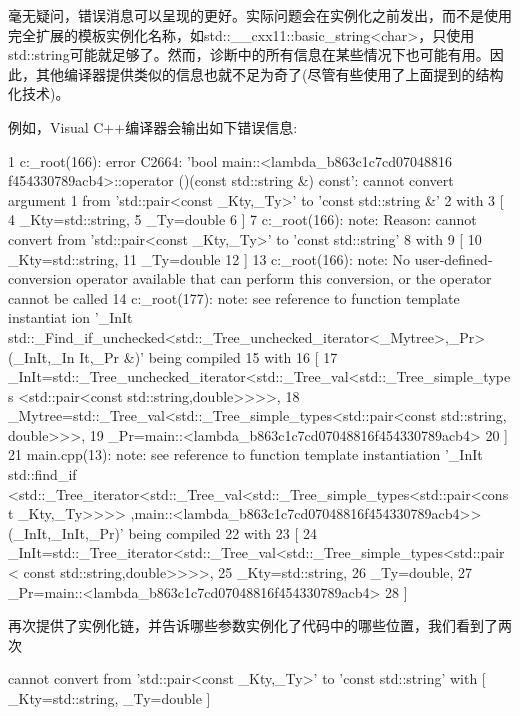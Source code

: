 毫无疑问，错误消息可以呈现的更好。实际问题会在实例化之前发出，而不是使用完全扩展的模板实例化名称，如std::\_\_cxx11::basic\_string<char>，只使用std::string可能就足够了。然而，诊断中的所有信息在某些情况下也可能有用。因此，其他编译器提供类似的信息也就不足为奇了(尽管有些使用了上面提到的结构化技术)。

例如，Visual C++编译器会输出如下错误信息:

{\scriptsize
\begin{shell}
1  c:\tools_root\cl\inc\algorithm(166): error C2664: ’bool main::<lambda_b863c1c7cd07048816
   f454330789acb4>::operator ()(const std::string &) const’: cannot convert argument 1 from
   ’std::pair<const _Kty,_Ty>’ to ’const std::string &’
2          with
3          [
4              _Kty=std::string,
5              _Ty=double
6          ]
7  c:\tools_root\cl\inc\algorithm(166): note: Reason: cannot convert from ’std::pair<const
   _Kty,_Ty>’ to ’const std::string’
8          with
9          [
10             _Kty=std::string,
11             _Ty=double
12         ]
13 c:\tools_root\cl\inc\algorithm(166): note: No user-defined-conversion operator available
   that can perform this conversion, or the operator cannot be called
14 c:\tools_root\cl\inc\algorithm(177): note: see reference to function template instantiat
   ion ’_InIt std::_Find_if_unchecked<std::_Tree_unchecked_iterator<_Mytree>,_Pr>(_InIt,_In
   It,_Pr &)’ being compiled
15         with
16         [
17              _InIt=std::_Tree_unchecked_iterator<std::_Tree_val<std::_Tree_simple_types
                <std::pair<const std::string,double>>>>,
18              _Mytree=std::_Tree_val<std::_Tree_simple_types<std::pair<const std::string,
                double>>>,
19              _Pr=main::<lambda_b863c1c7cd07048816f454330789acb4>
20         ]
21 main.cpp(13): note: see reference to function template instantiation ’_InIt std::find_if
   <std::_Tree_iterator<std::_Tree_val<std::_Tree_simple_types<std::pair<const _Kty,_Ty>>>>
   ,main::<lambda_b863c1c7cd07048816f454330789acb4>>(_InIt,_InIt,_Pr)’ being compiled
22         with
23         [
24             _InIt=std::_Tree_iterator<std::_Tree_val<std::_Tree_simple_types<std::pair<
               const std::string,double>>>>,
25             _Kty=std::string,
26             _Ty=double,
27             _Pr=main::<lambda_b863c1c7cd07048816f454330789acb4>
28         ]
\end{shell}
}

再次提供了实例化链，并告诉哪些参数实例化了代码中的哪些位置，我们看到了两次

{\scriptsize
\begin{shell}
cannot convert from ’std::pair<const _Kty,_Ty>’ to ’const std::string’
with
[
    _Kty=std::string,
    _Ty=double
]
\end{shell}
}


